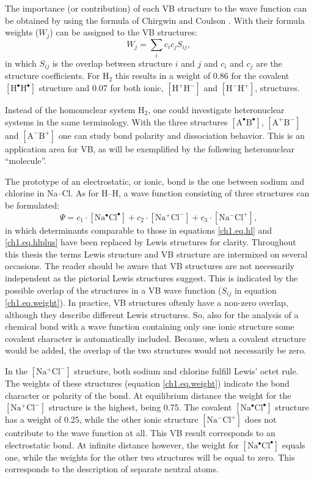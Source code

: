 The importance (or contribution) of each VB structure to the wave function can be obtained by using the formula of Chirgwin and Coulson \cite{chirgwin}. With their formula weights ($W_j$) can be assigned to the VB structures:
\begin{equation}
W_{j}=\sum_{i} c_{i}c_{j}S_{ij},
\label{ch1.eq.weight}
\end{equation}
in which $S_{ij}$ is the overlap between structure $i$ and $j$ and $c_i$ and $c_j$ are the structure coefficients. For H$_2$ this results in a weight of 0.86 for the covalent $\mathrm{[H^\bullet H^\bullet]}$ structure and 0.07 for both ionic, $\mathrm{[H^{+} H^{-}]}$ and $\mathrm{[H^{-} H^{+}]}$, structures. 

Instead of the homonuclear system H$_2$, one could investigate heteronuclear systems in the same terminology. With the three structures $\mathrm{[A^\bullet B^\bullet]}$, $\mathrm{[A^{+} B^{-}]}$ and $\mathrm{[A^{-} B^{+}]}$ one can study bond polarity and dissociation behavior. This is an application area for VB, as will be exemplified by the following heteronuclear ``molecule''.

The prototype of an electrostatic, or ionic, bond is the one between sodium and chlorine in \mbox{Na--Cl}. As for H--H, a wave function consisting of three structures can be formulated:
\begin{equation}
\Psi = c_1 \cdot \mathrm{[Na^\bullet Cl^\bullet]} + c_2 \cdot \mathrm{[Na^{+} Cl^{-}]} + c_3 \cdot \mathrm{[Na^{-} Cl^{+}]},
\label{ch1.eq.nacl}
\end{equation}
in which determinants comparable to those in equations \ref{ch1.eq.hl} and \ref{ch1.eq.hlplus} have been replaced by Lewis structures for clarity. Throughout this thesis the terms Lewis structure and VB structure are intermixed on several occasions. The reader should be aware that VB structures are not necessarily independent as the pictorial Lewis structures suggest. This is indicated by the possible overlap of the structures in a VB wave function ($S_{ij}$ in equation \ref{ch1.eq.weight}). In practice, VB structures oftenly have a non-zero overlap, although they describe different Lewis structures. So, also for the analysis of a chemical bond with a wave function containing only one ionic structure some covalent character is automatically included. Because, when a covalent structure would be added, the overlap of the two structures would not necessarily be zero.

In the $\mathrm{[Na^{+} Cl^{-}]}$ structure, both sodium and chlorine fulfill Lewis' octet rule. The weights of these structures (equation \ref{ch1.eq.weight}) indicate the bond character or polarity of the bond. At equilibrium distance the weight for the $\mathrm{[Na^{+} Cl^{-}]}$ structure is the highest, being 0.75. The covalent $\mathrm{[Na^\bullet Cl^\bullet]}$ structure has a weight of 0.25, while the other ionic structure $\mathrm{[Na^{-} Cl^{+}]}$ does not contribute to the wave function at all. This VB result corresponds to an electrostatic bond. At infinite distance however, the weight for \mbox{$\mathrm{[Na^\bullet Cl^\bullet]}$} equals one, while the weights for the other two structures will be equal to zero. This corresponds to the description of separate neutral atoms.

